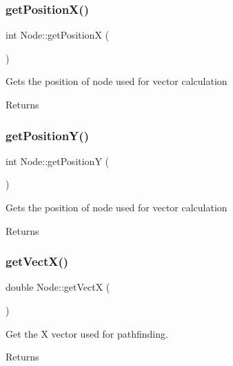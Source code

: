 \subsubsection{\texorpdfstring{getPositionX()}{getPositionX()}}
{\footnotesize\ttfamily int Node\+::get\+PositionX (\begin{DoxyParamCaption}{ }\end{DoxyParamCaption})}



Gets the position of node used for vector calculation 

\begin{DoxyReturn}{Returns}

\end{DoxyReturn}
\mbox{\label{class_node_a9a5a7aa1c1cade5e1c959115d8f56441}} 
\subsubsection{\texorpdfstring{getPositionY()}{getPositionY()}}
{\footnotesize\ttfamily int Node\+::get\+PositionY (\begin{DoxyParamCaption}{ }\end{DoxyParamCaption})}



Gets the position of node used for vector calculation 

\begin{DoxyReturn}{Returns}

\end{DoxyReturn}
\mbox{\label{class_node_ab680abb24e66f0ac44ad1c01100c284d}} 
\subsubsection{\texorpdfstring{getVectX()}{getVectX()}}
{\footnotesize\ttfamily double Node\+::get\+VectX (\begin{DoxyParamCaption}{ }\end{DoxyParamCaption})}



Get the X vector used for pathfinding. 

\begin{DoxyReturn}{Returns}

\end{DoxyReturn}
\mbox{\label{class_node_a94cc29a521ebaf4de2a8d71b7e55346e}} 
